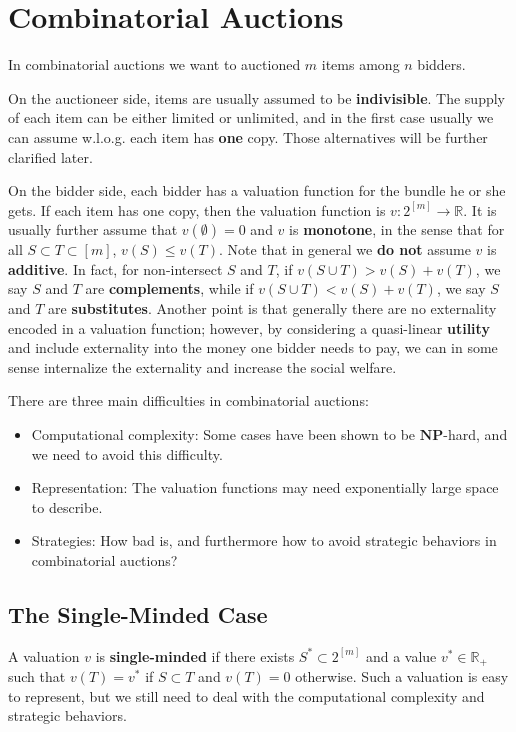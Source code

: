 \documentclass[openany]{book}
\theoremstyle{remark}
\begin{document}
\chapter{Combinatorial Auctions}
In combinatorial auctions we want to auctioned $m$ items among $n$ bidders.

On the auctioneer side, items are usually assumed to be \textbf{indivisible}. The supply of each item can be either limited or unlimited, and in the first case usually we can assume w.l.o.g. each item has \textbf{one} copy. Those alternatives will be further clarified later.

On the bidder side, each bidder has a valuation function for the bundle he or she gets. If each item has one copy, then the valuation function is $v:2^{[m]}\to \mathbb{R}$. It is usually further assume that $v(\emptyset)=0$ and $v$ is \textbf{monotone}, in the sense that for all $S\subset T\subset[m]$, $v(S)\le v(T)$. Note that in general we \textbf{do not} assume $v$ is \textbf{additive}. In fact, for non-intersect $S$ and $T$, if $v(S\cup T)>v(S)+v(T)$, we say $S$ and $T$ are \textbf{complements}, while if $v(S\cup T)<v(S)+v(T)$, we say $S$ and $T$ are \textbf{substitutes}. Another point is that generally there are no externality encoded in a valuation function; however, by considering a quasi-linear \textbf{utility} and include externality into the money one bidder needs to pay, we can in some sense internalize the externality and increase the social welfare.

There are three main difficulties in combinatorial auctions:
\begin{itemize}
    \item Computational complexity: Some cases have been shown to be $\mathbf{NP}$-hard, and we need to avoid this difficulty.
    \item Representation: The valuation functions may need exponentially large space to describe.
    \item Strategies: How bad is, and furthermore how to avoid strategic behaviors in combinatorial auctions?
\end{itemize}

\section{The Single-Minded Case}
A valuation $v$ is \textbf{single-minded} if there exists $S^*\subset 2^{[m]}$ and a value $v^*\in \mathbb{R}_+$ such that $v(T)=v^*$ if $S\subset T$ and $v(T)=0$ otherwise. Such a valuation is easy to represent, but we still need to deal with the computational complexity and strategic behaviors.
\end{document}
